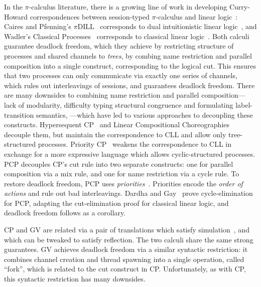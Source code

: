 \documentclass[main.tex]{subfiles}
\begin{document}
In the $\pi$-calculus literature, there is a growing line of work in developing Curry-Howard correspondences between session-typed $\pi$-calculus and linear logic~\cite{girard87}: Caires and Pfenning's $\pi$DILL~\cite{cairespfenning10} corresponds to dual intuitionistic linear logic~\cite{barber96}, and Wadler's Classical Processes~\cite[CP]{wadler14} corresponds to classical linear logic~\cite[CLL]{girard87}. Both calculi guarantee deadlock freedom, which they achieve by restricting structure of processes and shared channels to \emph{trees}, by combing name restriction and parallel composition into a single construct, corresponding to the logical cut. This ensures that two processes can only communicate via exactly one series of channels, which rules out interleavings of sessions, and guarantees deadlock freedom.
There are many downsides to combining name restriction and parallel composition---lack of modularity, difficulty typing structural congruence and formulating label-transition semantics, \etc---which have led to various approaches to decoupling these constructs. Hypersequent CP~\cite{MP18,kokkemontesi19popl,kokkemontesi19tlla} and Linear Compositional Choreographies~\cite{CarboneMS18} decouple them, but maintain the correspondence to CLL and allow only tree-structured processes. Priority CP~\cite[PCP]{dardhagay18extended} weakens the correspondence to CLL in exchange for a more expressive language which allows cyclic-structured processes. PCP decouples CP's cut rule into two separate constructs: one for parallel composition via a mix rule, and one for name restriction via a cycle rule. To restore deadlock freedom, PCP uses \emph{priorities}~\cite{kobayashi06,padovani14}. Priorities encode the \emph{order of actions} and rule out bad interleavings. Dardha and Gay~\cite{dardhagay18extended} prove cycle-elimination for PCP, adapting the cut-elimination proof for classical linear logic, and deadlock freedom follows as a corollary.

CP and GV are related via a pair of translations which satisfy simulation~\cite{lindleymorris16}, and which can be tweaked to satisfy reflection. The two calculi share the same strong guarantees. GV achieves deadlock freedom via a similar syntactic restriction: it combines channel creation and thread spawning into a single operation, called ``fork'', which is related to the cut construct in CP. Unfortunately, as with CP, this syntactic restriction has many downsides.
\end{document}
